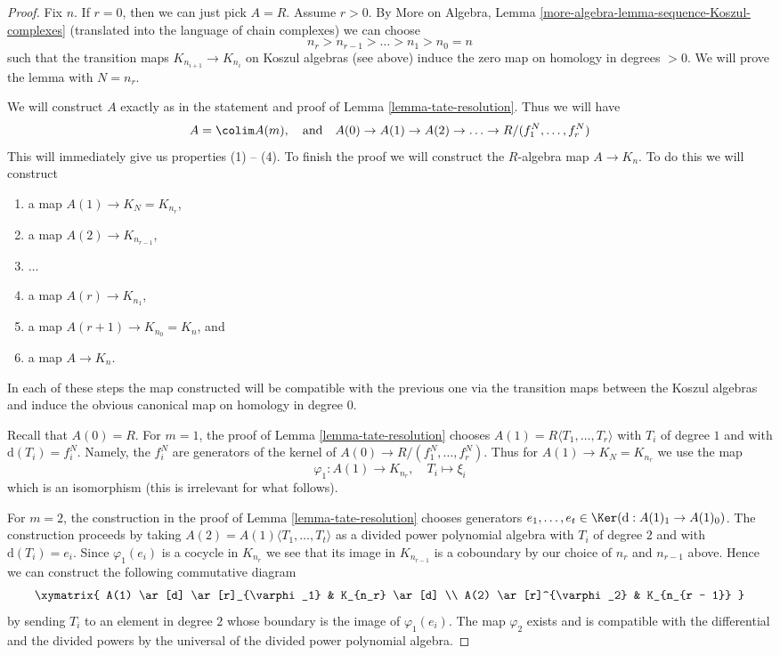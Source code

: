 \begin{proof}
Fix $n$. If $r = 0$, then we can just pick $A = R$. Assume $r > 0$. By
More on Algebra, Lemma \ref{more-algebra-lemma-sequence-Koszul-complexes}
(translated into the language of chain complexes) we can choose
$$
n_{r} > n_{r - 1} > \ldots > n_1 > n_0 = n
$$
such that the transition maps $K_{n_{i + 1}} \to K_{n_i}$ on Koszul
algebras (see above) induce the zero map on homology in degrees $> 0$.
We will prove the lemma with $N = n_r$.

\medskip\noindent
We will construct $A$ exactly as in the statement and proof of
Lemma \ref{lemma-tate-resolution}. Thus we will have
$$
A = \colim A(m),\quad\text{and}\quad
A(0) \to A(1) \to A(2) \to \ldots \to R/(f_1^N, \ldots, f_r^N)
$$
This will immediately give us properties (1) -- (4). To finish the proof
we will construct the $R$-algebra map $A \to K_n$. To do this we will
construct
\begin{enumerate}
\item a map $A(1) \to K_N = K_{n_r}$,
\item a map $A(2) \to K_{n_{r - 1}}$,
\item $\ldots$
\item a map $A(r) \to K_{n_1}$,
\item a map $A(r + 1) \to K_{n_0} = K_n$, and
\item a map $A \to K_n$.
\end{enumerate}
In each of these steps the map constructed will be compatible with the
previous one via the transition maps between the Koszul algebras
and induce the obvious canonical map on homology in degree $0$.

\medskip\noindent
Recall that $A(0) = R$. For $m = 1$, the proof of
Lemma \ref{lemma-tate-resolution}
chooses $A(1) = R\langle T_1, \ldots, T_r\rangle$ with
$T_i$ of degree $1$ and with $\text{d}(T_i) = f_i^N$.
Namely, the $f_i^N$ are generators of the kernel of
$A(0) \to R/(f_1^N, \ldots, f_r^N)$.
Thus for $A(1) \to K_N = K_{n_r}$ we use the map
$$
\varphi_1 : A(1) \longrightarrow K_{n_r},\quad T_i \longmapsto \xi_i
$$
which is an isomorphism (this is irrelevant for what follows).

\medskip\noindent
For $m = 2$, the construction in the proof of Lemma \ref{lemma-tate-resolution}
chooses generators $e_1, \ldots, e_t \in \Ker(\text{d} : A(1)_1 \to A(1)_0)$.
The construction proceeds by taking
$A(2) = A(1)\langle T_1, \ldots, T_t\rangle$
as a divided power polynomial algebra with $T_i$ of degree $2$
and with $\text{d}(T_i) = e_i$.
Since $\varphi_1(e_i)$ is a cocycle in $K_{n_r}$
we see that its image in $K_{n_{r - 1}}$ is a coboundary by
our choice of $n_r$ and $n_{r - 1}$ above.
Hence we can construct the following commutative diagram
$$
\xymatrix{
A(1) \ar[d] \ar[r]_{\varphi_1} & K_{n_r} \ar[d] \\
A(2) \ar[r]^{\varphi_2} & K_{n_{r - 1}}
}
$$
by sending $T_i$ to an element in degree $2$ whose boundary is the
image of $\varphi_1(e_i)$. The map $\varphi_2$ exists and is compatible
with the differential and the divided powers by the universal
of the divided power polynomial algebra.


\end{proof}
